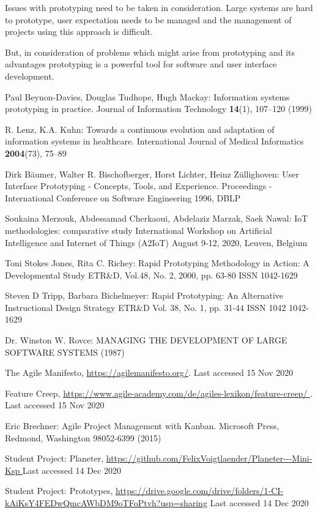 \documentclass[runningheads]{llncs}
\begin{document}
Issues with prototyping need to be taken in consideration. Large systems are hard to prototype, user expectation needs to be managed and the 
management of projects using this approach is difficult.

But, in consideration of problems which might arise from prototyping and its advantages prototyping is a powerful tool for software and user interface
development.


%
%
%
% 
% 
%
\begin{thebibliography}{8}

Paul Beynon-Davies, Douglas Tudhope, Hugh Mackay: Information systems prototyping in practice. 
Journal of Information Technology  \textbf{14}(1), 107--120 (1999) 

R. Lenz, K.A. Kuhn: Towards a continuous evolution and adaptation of
information systems in healthcare. 
International Journal of Medical Informatics   \textbf{2004}(73), 75--89

Dirk Bäumer, Walter R. Bischofberger, Horst Lichter, Heinz Züllighoven: User Interface Prototyping - Concepts, Tools, and Experience.
Proceedings - International Conference on Software Engineering 1996, DBLP 

Soukaina Merzouk, Abdessamad Cherkaoui, Abdelaziz Marzak, Saek Nawal: IoT methodologies: comparative study
International Workshop on Artificial Intelligence and Internet of Things (A2IoT) August 9-12, 2020, Leuven, Belgium

Toni Stokes Jones, Rita C. Richey: Rapid Prototyping Methodology in Action: A Developmental Study
ETR\&D, Vol.48, No. 2, 2000, pp. 63-80 ISSN 1042-1629

Steven D Tripp, Barbara Bichelmeyer: Rapid Prototyping: An Alternative Instructional Design Strategy
ETR\&D Vol. 38, No. 1, pp. 31-44 ISSN 1042 1042-1629

Dr. Winston W. Rovce: MANAGING THE DEVELOPMENT OF LARGE SOFTWARE SYSTEMS (1987)

The Agile Manifesto, \url{https://agilemanifesto.org/}. Last accessed 15
Nov 2020

Feature Creep, \url{https://www.agile-academy.com/de/agiles-lexikon/feature-creep/
}. Last accessed 15
Nov 2020

Eric Brechner: Agile Project Management with Kanban. Microsoft Press,
Redmond, Washington 98052-6399 (2015)

Student Project: Planeter, \url{https://github.com/FelixVoigtlaender/Planeter---Mini-Ksp
} Last accessed 14
Dec 2020

Student Project: Prototypes, \url{https://drive.google.com/drive/folders/1-CI-kAiKsY4FEDwQmcAWbDM9oTFoPtvh?usp=sharing} Last accessed 14
Dec 2020

\end{thebibliography} 
\end{document}
